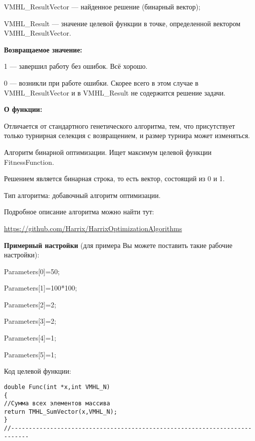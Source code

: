 \documentclass[a4paper,12pt]{article}
\begin{document}
VMHL\_ResultVector --- найденное решение (бинарный вектор);
 
VMHL\_Result --- значение целевой функции в точке, определенной вектором VMHL\_ResultVector.

\textbf{Возвращаемое значение:} 

 1 --- завершил работу без ошибок. Всё хорошо.
 
 0 --- возникли при работе ошибки. Скорее всего в этом случае в VMHL\_ResultVector и в VMHL\_Result не содержится решение задачи.

 
\textbf{О функции:}

Отличается от стандартного генетического алгоритма, тем, что присутствует только турнирная селекция с возвращением, и размер турнира может изменяться.

Алгоритм бинарной оптимизации. Ищет максимум целевой функции FitnessFunction.

Решением является бинарная строка, то есть вектор, состоящий из 0 и 1.

Тип алгоритма: добавочный алгоритм оптимизации.

Подробное описание алгоритма можно найти тут:

\href{https://github.com/Harrix/HarrixOptimizationAlgorithms/blob/master/\_HarrixOptimizationAlgorithms.pdf}{https://github.com/Harrix/HarrixOptimizationAlgorithms}

\textbf{Примерный настройки} (для примера Вы можете поставить такие рабочие настройки):

 Parameters[0]=50;
 
Parameters[1]=100*100;

Parameters[2]=2;

Parameters[3]=2;

Parameters[4]=1;

Parameters[5]=1;

Код целевой функции:
\begin{lstlisting}[caption=Оптимизируемая функция]
double Func(int *x,int VMHL_N)
{
//Сумма всех элементов массива
return TMHL_SumVector(x,VMHL_N);
}
//---------------------------------------------------------------------------
\end{lstlisting}
\end{document}
